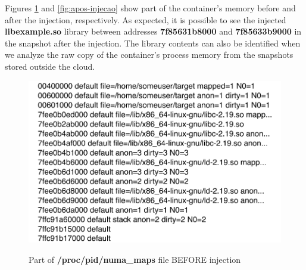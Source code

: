 \documentclass[conference]{IEEEtran}
\newcommand{\fancyname}{Dizang}
\begin{document}
%
Figures \ref{fig:antes-injecao} and \ref{fig:apos-injecao} show part of the container's memory before and after the injection, respectively.
%
As expected, it is possible to see the injected \textbf{libexample.so} library between addresses \textbf{7f85631b8000} and \textbf{7f85633b9000} in the snapshot after the injection.
%
The library contents can also be identified when we analyze the raw copy of the container's process memory from the snapshots stored outside the cloud.

%
%

\begin{figure}[htb!]
\footnotesize
\caption{Part of \textbf{/proc/pid/numa\_maps} file BEFORE injection }
\includegraphics[scale=0.60]{antes-injecao.pdf}
\centering
\label{fig:antes-injecao}
\end{figure}
\end{document}
